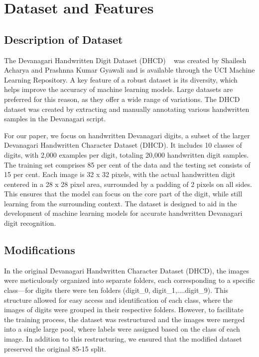 \documentclass[9pt,a4paper,twoside]{rho-class/rho}
\begin{document}
\section{Dataset and Features}

    \subsection{Description of Dataset}
    The Devanagari Handwritten Digit Dataset (DHCD) ~\cite{devanagari} was created by Shailesh Acharya and Prashnna Kumar Gyawali and is available through the UCI Machine Learning Repository. A key feature of a robust dataset is its diversity, which helps improve the accuracy of machine learning models. Large datasets are preferred for this reason, as they offer a wide range of variations. The DHCD dataset was created by extracting and manually annotating various handwritten samples in the Devanagari script.

    For our paper, we focus on handwritten Devanagari digits, a subset of the larger Devanagari Handwritten Character Dataset (DHCD). It includes 10 classes of digits, with 2,000 examples per digit, totaling 20,000 handwritten digit samples. The training set comprises 85 per cent of the data and the testing set consists of 15 per cent. Each image is 32 x 32 pixels, with the actual handwritten digit centered in a 28 x 28 pixel area, surrounded by a padding of 2 pixels on all sides. This ensures that the model can focus on the core part of the digit, while still learning from the surrounding context. The dataset is designed to aid in the development of machine learning models for accurate handwritten Devanagari digit recognition.

    
    \subsection{Modifications}
   In the original Devanagari Handwritten Character Dataset (DHCD), the images were meticulously organized into separate folders, each corresponding to a specific class—for digits there were ten folders (digit\_0, digit\_1,....digit\_9). This structure allowed for easy access and identification of each class, where the images of digits were grouped in their respective folders. However, to facilitate the training process, the dataset was restructured and the images were merged into a single large pool, where labels were assigned based on the class of each image. In addition to this restructuring, we ensured that the modified dataset preserved the original 85-15 split.
\end{document}
